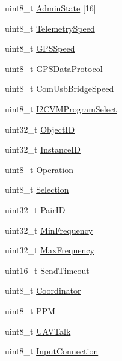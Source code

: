 \begin{DoxyCompactItemize}
uint8\-\_\-t \hyperlink{struct____attribute_____a5dd83cc2f9900c44dba1336b9d4f63a6}{\-Admin\-State} \mbox{[}16\mbox{]}
\item 
uint8\-\_\-t \hyperlink{struct____attribute_____aaaeb6daf4aecff5b744dc58c64b05d62}{\-Telemetry\-Speed}
\item 
uint8\-\_\-t \hyperlink{struct____attribute_____ac5ed8c5cec33c83e0c62711ba8e92558}{\-G\-P\-S\-Speed}
\item 
uint8\-\_\-t \hyperlink{struct____attribute_____a66b998daa51777f1f455767be9e45ef2}{\-G\-P\-S\-Data\-Protocol}
\item 
uint8\-\_\-t \hyperlink{struct____attribute_____aaf60461ebd36601cd402333530161f8f}{\-Com\-Usb\-Bridge\-Speed}
\item 
uint8\-\_\-t \hyperlink{struct____attribute_____a96251c39ee3061820ae8aeb66ca5713f}{\-I2\-C\-V\-M\-Program\-Select}
\item 
uint32\-\_\-t \hyperlink{struct____attribute_____a77530b31cea5b97dcdc3e35af7b4390a}{\-Object\-I\-D}
\item 
uint32\-\_\-t \hyperlink{struct____attribute_____a1c564790a90a4716b8018747eca90ce0}{\-Instance\-I\-D}
\item 
uint8\-\_\-t \hyperlink{struct____attribute_____a15c277558e77fa3ec8d53de0b3df3268}{\-Operation}
\item 
uint8\-\_\-t \hyperlink{struct____attribute_____a310f6a6fd620dc4a2162e3db8a11545e}{\-Selection}
\item 
uint32\-\_\-t \hyperlink{struct____attribute_____afdba08a04bf16a8d9d2a47f2de0138b3}{\-Pair\-I\-D}
\item 
uint32\-\_\-t \hyperlink{struct____attribute_____af4238aa7e321ac0d9825e3c3e88e2dcd}{\-Min\-Frequency}
\item 
uint32\-\_\-t \hyperlink{struct____attribute_____a18d8e936acf9d79d9ec8e75b0ab73ac9}{\-Max\-Frequency}
\item 
uint16\-\_\-t \hyperlink{struct____attribute_____a6863757f230df9c593c0e883afa62630}{\-Send\-Timeout}
\item 
uint8\-\_\-t \hyperlink{struct____attribute_____ad330cf70033ead9ba80e4496abdf70b2}{\-Coordinator}
\item 
uint8\-\_\-t \hyperlink{struct____attribute_____a1c4b93594b3d978ec8e9795d44c8cdbe}{\-P\-P\-M}
\item 
uint8\-\_\-t \hyperlink{struct____attribute_____a04645fdb40f84626448ab65edf2c8d7d}{\-U\-A\-V\-Talk}
\item 
uint8\-\_\-t \hyperlink{struct____attribute_____aef2ee3a1d1a9e1de72708746056a5cea}{\-Input\-Connection}

\end{DoxyCompactItemize}
